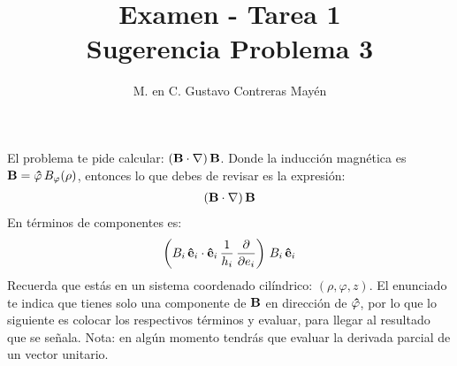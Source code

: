 
\usepackage{apacite}
\title{Examen - Tarea 1 \\[0.3em]  \large{Sugerencia Problema 3}\vspace{-3ex}}
\author{M. en C. Gustavo Contreras Mayén}
\date{ }

\vspace{-4cm}
\maketitle
\fontsize{14}{14}\selectfont

El problema te pide calcular: $(\vb{B \cdot \nabla}) \, \vb{B}$. Donde la inducción magnética es $\vb{B} = \vu{\varphi} \, B_{\varphi}(\rho)$, entonces lo que debes de revisar es la expresión:
\begin{align*}
(\vb{B \cdot \nabla}) \, \vb{B}
\end{align*}
En términos de componentes es:
\begin{align*}
\left( B_{i} \, \vu{e}_{i} \cdot  \vu{e}_{i} \, \dfrac{1}{h_{i}} \, \pdv{e_{i}} \right) \, B_{i} \, \vu{e}_{i}
\end{align*}
Recuerda que estás en un sistema coordenado cilíndrico: $(\rho, \varphi, z)$. El enunciado te indica que tienes solo una componente de $\vb{B}$ en dirección de $\vu{\varphi}$, por lo que lo siguiente es colocar los respectivos términos y evaluar, para llegar al resultado que se señala. Nota: en algún momento tendrás que evaluar la derivada parcial de un vector unitario.



